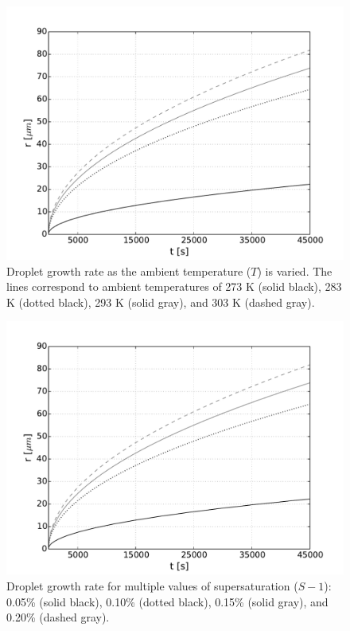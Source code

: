 \documentclass[]{article}
\begin{document}
\begin{figure}\label{fig:temperature}
    \centering
    \includegraphics[width=\textwidth]{r_t_temperature.pdf}
    \caption{Droplet growth rate as the ambient temperature ($T$) is varied. The lines correspond to ambient temperatures of 273 K (solid black), 283 K (dotted black), 293 K (solid gray), and 303 K (dashed gray).}
\end{figure}

\begin{figure}\label{fig:supersaturation}
    \centering
    \includegraphics[width=\textwidth]{r_t_temperature.pdf}
    \caption{Droplet growth rate for multiple values of supersaturation ($S - 1$): 0.05\% (solid black), 0.10\% (dotted black), 0.15\% (solid gray), and 0.20\% (dashed gray).}
\end{figure}
\end{document}
